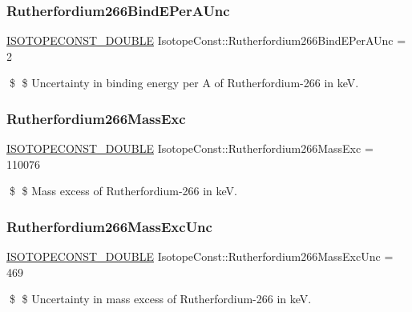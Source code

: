 \subsubsection{\texorpdfstring{Rutherfordium266\+Bind\+E\+Per\+A\+Unc}{Rutherfordium266BindEPerAUnc}}
{\footnotesize\ttfamily \mbox{\hyperlink{group___isotope_const-_macros_ga8f45a7272ce02c0b4c65c44636ed719a}{I\+S\+O\+T\+O\+P\+E\+C\+O\+N\+S\+T\+\_\+\+D\+O\+U\+B\+LE}} Isotope\+Const\+::\+Rutherfordium266\+Bind\+E\+Per\+A\+Unc = 2}

\$ \$ Uncertainty in binding energy per A of Rutherfordium-\/266 in keV. \mbox{\label{group___isotope_const-_rutherfordium-_rf266_gaf8cd27c47b3d47f3716e7f7670910b9a}} 
\subsubsection{\texorpdfstring{Rutherfordium266\+Mass\+Exc}{Rutherfordium266MassExc}}
{\footnotesize\ttfamily \mbox{\hyperlink{group___isotope_const-_macros_ga8f45a7272ce02c0b4c65c44636ed719a}{I\+S\+O\+T\+O\+P\+E\+C\+O\+N\+S\+T\+\_\+\+D\+O\+U\+B\+LE}} Isotope\+Const\+::\+Rutherfordium266\+Mass\+Exc = 110076}

\$ \$ Mass excess of Rutherfordium-\/266 in keV. \mbox{\label{group___isotope_const-_rutherfordium-_rf266_gad2175ad5b621bdd097b1696d8bec72ab}} 
\subsubsection{\texorpdfstring{Rutherfordium266\+Mass\+Exc\+Unc}{Rutherfordium266MassExcUnc}}
{\footnotesize\ttfamily \mbox{\hyperlink{group___isotope_const-_macros_ga8f45a7272ce02c0b4c65c44636ed719a}{I\+S\+O\+T\+O\+P\+E\+C\+O\+N\+S\+T\+\_\+\+D\+O\+U\+B\+LE}} Isotope\+Const\+::\+Rutherfordium266\+Mass\+Exc\+Unc = 469}

\$ \$ Uncertainty in mass excess of Rutherfordium-\/266 in keV. \mbox{\label{group___isotope_const-_rutherfordium-_rf266_gafba6dfe14da70e9082453dbeabc16687}} 
